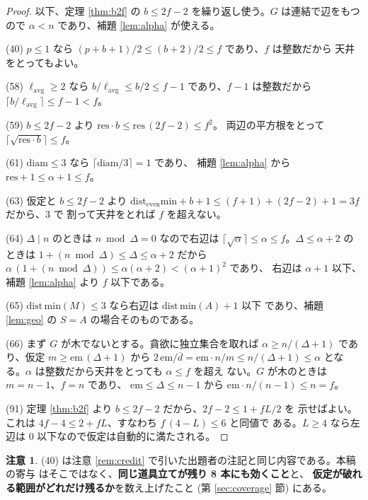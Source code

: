 \documentclass[paper=a4,fontsize=10.5pt,jafontsize=10.5pt]{jlreq}
\theoremstyle{plain}
\theoremstyle{definition}
\newtheorem{remark}[theorem]{注意}
\begin{document}
\begin{proof}
以下、定理 \ref{thm:b2f} の $b \le 2f-2$ を繰り返し使う。$G$ は連結で辺をもつ
ので $\alpha < n$ であり、補題 \ref{lem:alpha} が使える。

(40) $p \le 1$ なら $(p + b + 1)/2 \le (b+2)/2 \le f$ であり、$f$ は整数だから
天井をとってもよい。

(58) $\ell_{\mathrm{avg}} \ge 2$ なら
$b/\ell_{\mathrm{avg}} \le b/2 \le f - 1$ であり、$f-1$ は整数だから
$\lceil b/\ell_{\mathrm{avg}} \rceil \le f - 1 < f$。

(59) $b \le 2f-2$ より $\mathrm{res} \cdot b \le \mathrm{res}\,(2f-2) \le f^2$。
両辺の平方根をとって $\lceil \sqrt{\mathrm{res} \cdot b} \rceil \le f$。

(61) $\mathrm{diam} \le 3$ なら $\lceil \mathrm{diam}/3 \rceil = 1$ であり、
補題 \ref{lem:alpha} から $\mathrm{res} + 1 \le \alpha + 1 \le f$。

(63) 仮定と $b \le 2f-2$ より
$\mathrm{dist_{even}min} + b + 1 \le (f+1) + (2f-2) + 1 = 3f$ だから、$3$ で
割って天井をとれば $f$ を超えない。

(64) $\Delta \mid n$ のときは $n \bmod \Delta = 0$ なので右辺は
$\lceil \sqrt{\alpha} \rceil \le \alpha \le f$。$\Delta \le \alpha + 2$ の
ときは $1 + (n \bmod \Delta) \le \Delta \le \alpha + 2$ だから
$\alpha\,(1 + (n \bmod \Delta)) \le \alpha(\alpha+2) < (\alpha+1)^2$ であり、
右辺は $\alpha + 1$ 以下、補題 \ref{lem:alpha} より $f$ 以下である。

(65) $\mathrm{dist\,min}(M) \le 3$ なら右辺は $\mathrm{dist\,min}(A) + 1$ 以下
であり、補題 \ref{lem:geo} の $S = A$ の場合そのものである。

(66) まず $G$ が木でないとする。貪欲に独立集合を取れば
$\alpha \ge n/(\Delta+1)$ であり、仮定 $m \ge \mathrm{em}\,(\Delta+1)$ から
$2\,\mathrm{em}/\overline{d} = \mathrm{em} \cdot n/m \le n/(\Delta+1) \le
\alpha$ となる。$\alpha$ は整数だから天井をとっても $\alpha \le f$ を超え
ない。$G$ が木のときは $m = n-1$、$f = n$ であり、
$\mathrm{em} \le \Delta \le n-1$ から
$\mathrm{em} \cdot n/(n-1) \le n = f$。

(91) 定理 \ref{thm:b2f} より $b \le 2f-2$ だから、$2f - 2 \le 1 + fL/2$ を
示せばよい。これは $4f - 4 \le 2 + fL$、すなわち $f\,(4-L) \le 6$ と同値で
ある。$L \ge 4$ なら左辺は $0$ 以下なので仮定は自動的に満たされる。
\end{proof}

\begin{remark}\label{rem:credit40}
(40) は注意 \ref{rem:credit} で引いた出題者の注記と同じ内容である。本稿の寄与
はそこではなく、\textbf{同じ道具立てが残り 8 本にも効くこと}と、
\textbf{仮定が破れる範囲がどれだけ残るか}を数え上げたこと
(第 \ref{sec:coverage} 節) にある。
\end{remark}
\end{document}
